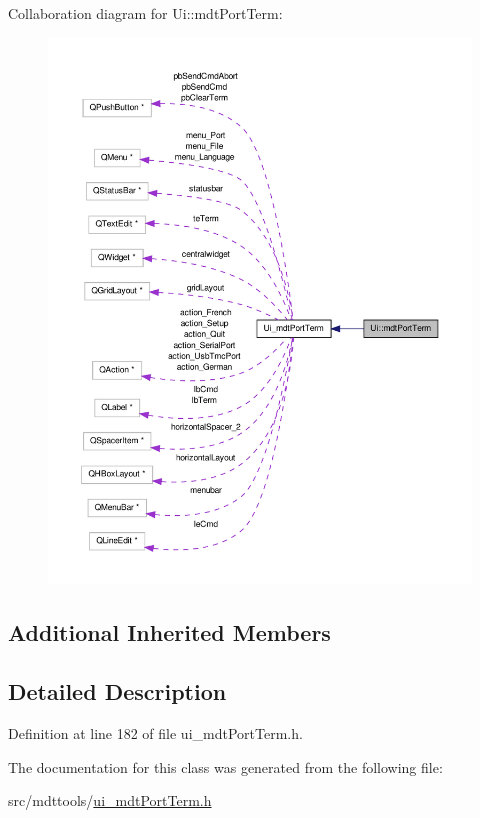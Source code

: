 Collaboration diagram for Ui\-:\-:mdt\-Port\-Term\-:\nopagebreak
\begin{figure}[H]
\begin{center}
\leavevmode
\includegraphics[width=350pt]{class_ui_1_1mdt_port_term__coll__graph}
\end{center}
\end{figure}
\subsection*{Additional Inherited Members}


\subsection{Detailed Description}


Definition at line 182 of file ui\-\_\-mdt\-Port\-Term.\-h.



The documentation for this class was generated from the following file\-:\begin{DoxyCompactItemize}
\item 
src/mdttools/\hyperlink{ui__mdt_port_term_8h}{ui\-\_\-mdt\-Port\-Term.\-h}\end{DoxyCompactItemize}
